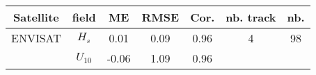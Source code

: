 \begin{center}
\begin{tabular}{|c|c|c|c|c|c|c|}
\hline
Satellite & field & ME & RMSE & Cor. & nb. track & nb.\\
\hline
ENVISAT & $H_s$    & 0.01 & 0.09 & 0.96 & 4 & 98\\
        & $U_{10}$ & -0.06 & 1.09 & 0.96 &    &   \\
\hline
\end{tabular}
\end{center}
